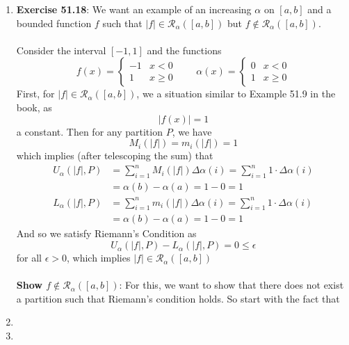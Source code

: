 \documentclass[12pt]{article}
\theoremstyle{plain}
\theoremstyle{definition}
\theoremstyle{remark}
\begin{document}
\begin{enumerate}
\newpage
\item \textbf{Exercise 51.18}: We want an example of an increasing
    $\alpha$ on $[a,b]$ and a bounded function $f$ such that
    $|f| \in \mathscr{R}_\alpha([a,b])$ but 
    $f \not\in \mathscr{R}_\alpha([a,b])$. 
    \\
    \\
    Consider the interval $[-1,1]$ and the functions
    \begin{equation}
        f(x) = 
            \begin{cases} 
                -1 & x < 0 \\
                1 & x \geq 0 
            \end{cases} 
        \qquad 
        \alpha(x) = 
            \begin{cases} 
                0 & x < 0 \\
                1 & x \geq 0 
            \end{cases} 
    \end{equation}
    First, for $|f| \in \mathscr{R}_\alpha([a,b])$, we
    a situation similar to Example 51.9 in the book, as 
        \[ |f(x)| = 1 \]
    a constant. Then for any partition $P$, we have
        \[ M_i(|f|) = m_i(|f|) = 1 \]
    which implies (after telescoping the sum) that 
    \begin{align*}
        U_\alpha(|f|, P) &= \sum^n_{i=1} M_i(|f|) \Delta\alpha(i)  =
            \sum^n_{i=1} 1\cdot \Delta\alpha(i) \\
            &= \alpha(b) -\alpha(a) = 1 - 0 = 1\\
        L_\alpha(|f|, P) &= \sum^n_{i=1} m_i(|f|) \Delta\alpha(i) =
            \sum^n_{i=1} 1\cdot \Delta\alpha(i) \\
            &= \alpha(b) -\alpha(a) = 1 - 0  = 1
    \end{align*}
    And so we satisfy Riemann's Condition as
        \[ U_\alpha(|f|, P) - L_\alpha(|f|, P) = 0 \leq \epsilon \]
    for all $\epsilon>0$, which implies $|f| \in \mathscr{R}_\alpha([a,b])$
    \\
    \\
    \textbf{Show $f\not\in \mathscr{R}_\alpha([a,b])$}: For this, we want
    to show that there does not exist a partition such that Riemann's
    condition holds. So start with the fact that 

            
        


\item 
\item 


\end{enumerate}





% 
\end{document}
